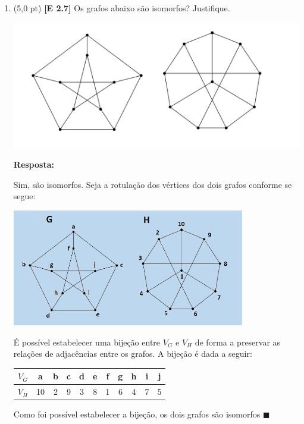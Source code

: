 \documentclass[12pt,a4paper,oneside]{article}
\begin{document}
\begin{enumerate}

	\item (5,0 pt) {\bf [E 2.7]} Os grafos abaixo são isomorfos? Justifique.
	\begin{center}
		\includegraphics[width=\textwidth]{images/grafos.png}
	\end{center} 
	
	{ \color{blue} {\bf Resposta:} 
		
		Sim, são isomorfos. Seja a rotulação dos vértices dos dois grafos conforme se segue:
		\begin{center}
			\includegraphics[width=0.8\textwidth]{images/grafos-rotulados.png}
		\end{center}
		É possível estabelecer uma bijeção entre $V_G$ e $V_H$ de forma a preservar as relações de adjacências entre os grafos. A bijeção é dada a seguir:
		\begin{center}
			\begin{tabular}{c|cccccccccc}
				$V_G$ 	&	a 	& b & c & d & e & f & g & h & i & j \\
				\hline
				$V_H$ 	&	10 	& 2 & 9 & 3 & 8 & 1 & 6 & 4 & 7 & 5 \\
			\end{tabular}
		\end{center}
		Como foi possível estabelecer a bijeção, os dois grafos são isomorfos $\blacksquare$
	}
	

\end{enumerate}
\end{document}
